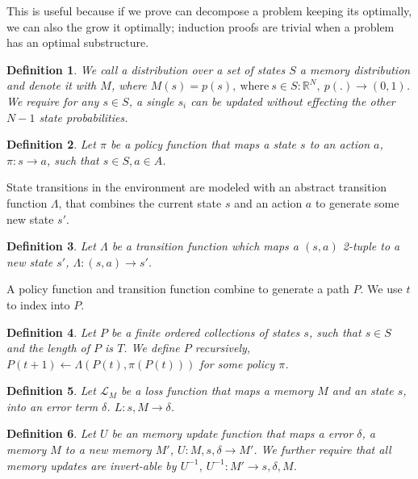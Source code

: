 \documentclass[9pt,twocolumn,twoside]{pnas-new}
\newtheorem{definition}{Definition}
\begin{document}
This is useful because if we prove can decompose a problem keeping its optimally, we can also the grow it optimally; induction proofs are trivial when a problem has an optimal substructure. 

\begin{definition}
    We call a distribution over a set of states $S$ a \textit{memory distribution} and denote it with $M$, where $M(s) = p(s), \ \text{where} \ s \in S : \mathbb{R}^N, \ p(.) \rightarrow (0, 1)$. We require for any $s \in S$, a single $s_i$ can be updated without effecting the other $N-1$ state probabilities. 
\end{definition}





\begin{definition}
    Let $\pi$ be a policy function that maps a state $s$ to an action $a$, $\pi : s \rightarrow a$, such that $s \in S, a \in A$.
\end{definition}

State transitions in the environment are modeled with an abstract transition function $\Lambda$, that combines the current state $s$ and an action $a$ to generate some new state $s'$.

\begin{definition}
    Let $\Lambda$ be a transition function which maps a $(s,a)$ 2-tuple to a new state $s'$, $\Lambda : (s, a) \rightarrow s'$.     
\end{definition}

A policy function and transition function combine to generate a path $P$. We use $t$ to index into $P$. 

\begin{definition}
    Let $P$ be a finite ordered collections of states $s$, such that $s \in S$ and the length of $P$ is $T$. We define $P$ recursively, $P(t+1) \leftarrow \Lambda(P(t), \pi(P(t)))$ for some policy $\pi$.
\end{definition}

\begin{definition}
    Let $\mathcal{L}_M$ be a loss function that maps a memory $M$ and an state $s$, into an error term $\delta$. $L : s, M \rightarrow \delta$.
\end{definition}

\begin{definition}
    Let $U$ be an memory update function that maps a error $\delta$, a memory $M$ to a new memory $M'$, $U : M, s, \delta \rightarrow M'$. We further require that all memory updates are invert-able by $U^{-1}$, $U^{-1} : M' \rightarrow s, \delta, M$.
\end{definition}
\end{document}
